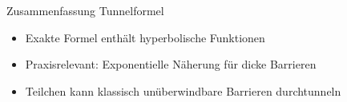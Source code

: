 \documentclass{beamer}
\begin{document}
    \begin{frame}{Zusammenfassung Tunnelformel}
        \begin{itemize}
            \item Exakte Formel enthält hyperbolische Funktionen
            \item Praxisrelevant: Exponentielle Näherung für dicke Barrieren
            \item Teilchen kann klassisch unüberwindbare Barrieren durchtunneln
        \end{itemize}
    \end{frame}



\end{document}
